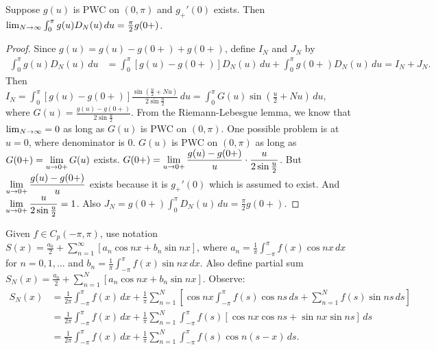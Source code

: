 \documentclass[]{article}
\begin{document}
\begin{lemma}
	Suppose $g(u)$ is PWC on $(0,\pi)$ and $g_+'(0)$ exists. Then $\lim_{N\rightarrow\infty} \int_0^\pi g(u) D_N(u) \, du = \frac{\pi}{2} g(0+)$.
\end{lemma}
\begin{proof} Since $g(u)=g(u)-g(0+)+g(0+)$, define $I_N$ and $J_N$ by
	\begin{align*} \int_0^\pi g(u) D_N(u) \, du &= \int_0^\pi [g(u) - g(0+)]D_N(u)\, du + \int_0^\pi g(0+) D_N(u) \, du = I_N + J_N. \end{align*}
	Then $\displaystyle I_N = \int_0^\pi [g(u) - g(0+)] \frac{\sin{\left(\frac{u}{2}+Nu\right)}}{2\sin{\frac{u}{2}}}\, du = \int_0^\pi G(u) \sin{\left(\frac{u}{2} + Nu\right)} \, du, $
	where $\displaystyle G(u) = \frac{g(u)-g(0+)}{2\sin{\frac{u}{2}}}$.
	From the Riemann-Lebesgue lemma, we know that $\lim_{N\rightarrow\infty} = 0$ as long as $G(u)$ is PWC on $(0,\pi)$.
	One possible problem is at $u=0$, where denominator is 0. $G(u)$ is PWC on $(0,\pi)$ as long as $\displaystyle G(0+) = \lim_{u\rightarrow0+} G(u)$ exists. $\displaystyle G(0+) = \lim_{u\rightarrow0+} \frac{g(u)-g(0+)}{u} \cdot \frac{u}{2\sin{\frac{u}{2}}}$. But $\displaystyle \lim_{u\rightarrow0+} \frac{g(u)-g(0+)}{u}$ exists because it is $g_+'(0)$ which is assumed to exist. And $\displaystyle \lim_{u\rightarrow0+} \frac{u}{2\sin{\frac{u}{2}}} = 1$. Also $J_N = g(0+) \int_0^\pi D_N(u) \, du = \frac{\pi}{2} g(0+)$.
\end{proof}

Given $f\in C_p(-\pi,\pi)$, use notation $\displaystyle S(x) = \frac{a_0}{2} + \sum_{n=1}^\infty [a_n \cos{nx} + b_n\sin{nx}]$, where $a_n = \frac{1}{\pi} \int_{-\pi}^\pi f(x) \cos{nx} \, dx$ for $n=0,1,\dots$ and $b_n = \frac{1}{\pi} \int_{-\pi}^\pi f(x) \sin{nx} \, dx$. Also define partial sum $S_N(x) = \frac{a_0}{2} + \sum_{n=1}^N [ a_n \cos{nx} + b_n \sin{nx}]$. Observe: \begin{align*} S_N(x) &= \frac{1}{2\pi}\int_{-\pi}^\pi f(x) \, dx + \frac{1}{\pi} \sum_{n=1}^N \left[ \cos{nx} \int_{-\pi}^\pi f(s) \cos{ns}\, ds + \sum_{n=1}^N f(s) \sin{ns} \, ds \right] \\ &= \frac{1}{2\pi} \int_{-\pi}^\pi f(x) \, dx + \frac{1}{\pi} \sum_{n=1}^N \int_{-\pi}^\pi f(s) [\cos{nx}\cos{ns} + \sin{nx}\sin{ns}] \, ds \\ &= \frac{1}{2\pi} \int_{-\pi}^\pi f(x) \, dx + \frac{1}{\pi} \sum_{n=1}^N \int_{-\pi}^\pi f(s) \cos{n(s-x)} \, ds .\end{align*}
\end{document}
